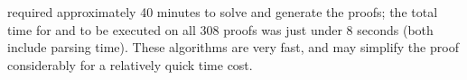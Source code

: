 


{\SPASS} required approximately 40 minutes to solve and generate the proofs; the total time for {\GFOLU} and {\FORPI} to be executed on all 308 proofs was just under 8 seconds (both include parsing time). These algorithms are very fast, and may simplify the proof considerably for a relatively quick time cost.

